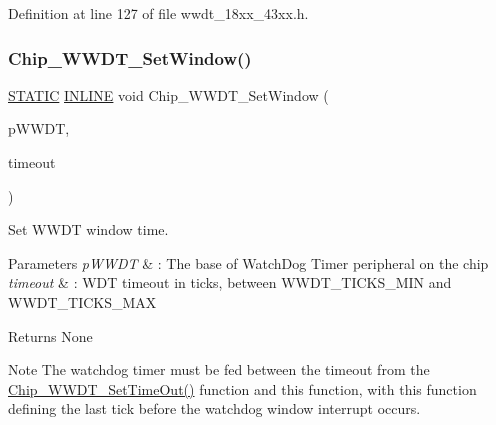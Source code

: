 Definition at line 127 of file wwdt\+\_\+18xx\+\_\+43xx.\+h.

\mbox{\label{group___w_w_d_t__18_x_x__43_x_x_gaad121c7d4960ceec5626e8bad047c966}} 
\subsubsection{\texorpdfstring{Chip\+\_\+\+W\+W\+D\+T\+\_\+\+Set\+Window()}{Chip\_WWDT\_SetWindow()}}
{\footnotesize\ttfamily \hyperlink{group___l_p_c___types___public___macros_ga10b2d890d871e1489bb02b7e70d9bdfb}{S\+T\+A\+T\+IC} \hyperlink{spifi__18xx__43xx_8h_a2eb6f9e0395b47b8d5e3eeae4fe0c116}{I\+N\+L\+I\+NE} void Chip\+\_\+\+W\+W\+D\+T\+\_\+\+Set\+Window (\begin{DoxyParamCaption}\item[{\hyperlink{struct_l_p_c___w_w_d_t___t}{L\+P\+C\+\_\+\+W\+W\+D\+T\+\_\+T} $\ast$}]{p\+W\+W\+DT,  }\item[{uint32\+\_\+t}]{timeout }\end{DoxyParamCaption})}



Set W\+W\+DT window time. 


\begin{DoxyParams}{Parameters}
{\em p\+W\+W\+DT} & \+: The base of Watch\+Dog Timer peripheral on the chip \\
\hline
{\em timeout} & \+: W\+DT timeout in ticks, between W\+W\+D\+T\+\_\+\+T\+I\+C\+K\+S\+\_\+\+M\+IN and W\+W\+D\+T\+\_\+\+T\+I\+C\+K\+S\+\_\+\+M\+AX \\
\hline
\end{DoxyParams}
\begin{DoxyReturn}{Returns}
None 
\end{DoxyReturn}
\begin{DoxyNote}{Note}
The watchdog timer must be fed between the timeout from the \hyperlink{group___w_w_d_t__18_x_x__43_x_x_ga3147a15042f4276588c83e98b0a1b996}{Chip\+\_\+\+W\+W\+D\+T\+\_\+\+Set\+Time\+Out()} function and this function, with this function defining the last tick before the watchdog window interrupt occurs. 
\end{DoxyNote}


